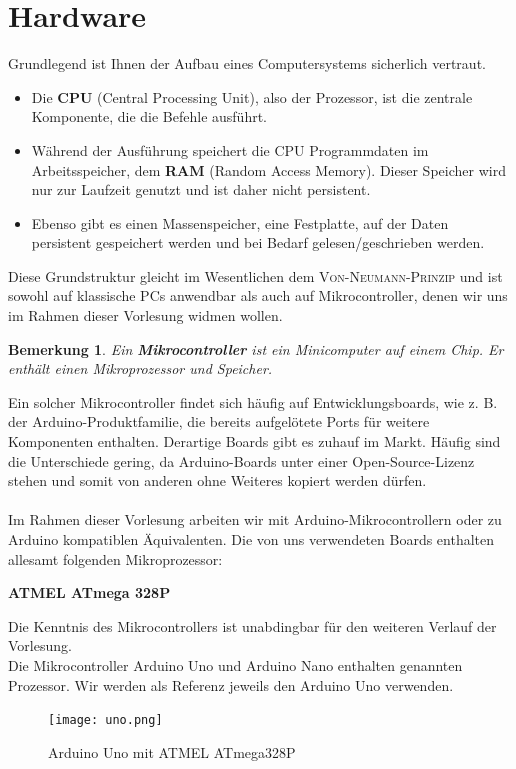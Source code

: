 \documentclass[11pt,a4paper]{scrartcl}
\newtheorem{note}{Bemerkung}
\begin{document}
\section{Hardware}
Grundlegend ist Ihnen der Aufbau eines Computersystems sicherlich vertraut.
\begin{itemize}
\item Die \textbf{CPU} (Central Processing Unit), also der Prozessor, ist die zentrale Komponente, die die Befehle ausführt.
\item Während der Ausführung speichert die CPU Programmdaten im Arbeitsspeicher, dem \textbf{RAM} (Random Access Memory). Dieser Speicher wird nur zur Laufzeit genutzt und ist daher nicht persistent.
\item Ebenso gibt es einen Massenspeicher, eine Festplatte, auf der Daten persistent gespeichert werden und bei Bedarf gelesen/geschrieben werden.
\end{itemize}
Diese Grundstruktur gleicht im Wesentlichen dem \textsc{Von-Neumann-Prinzip} und ist sowohl auf klassische PCs anwendbar als auch auf Mikrocontroller, denen wir uns im Rahmen dieser Vorlesung widmen wollen.
\\
\begin{note}
Ein \textbf{Mikrocontroller} ist ein Minicomputer auf einem Chip. Er enthält einen Mikroprozessor und Speicher.
\end{note}
Ein solcher Mikrocontroller findet sich häufig auf Entwicklungsboards, wie z. B. der Arduino-Produktfamilie, die bereits aufgelötete Ports für weitere Komponenten enthalten. Derartige Boards gibt es zuhauf im Markt. Häufig sind die Unterschiede gering, da Arduino-Boards unter einer Open-Source-Lizenz stehen und somit von anderen ohne Weiteres kopiert werden dürfen. \\\\
Im Rahmen dieser Vorlesung arbeiten wir mit Arduino-Mikrocontrollern oder zu Arduino kompatiblen Äquivalenten. Die von uns verwendeten Boards enthalten allesamt folgenden Mikroprozessor:
\begin{center}
\textbf{ATMEL ATmega 328P}
\end{center}
Die Kenntnis des Mikrocontrollers ist unabdingbar für den weiteren Verlauf der Vorlesung. \\
Die Mikrocontroller Arduino Uno und Arduino Nano enthalten genannten Prozessor. Wir werden als Referenz jeweils den Arduino Uno verwenden.
\begin{figure}[h!]
\centering
\texttt{[image: uno.png]}
\caption{Arduino Uno mit ATMEL ATmega328P}
\end{figure}
\end{document}
